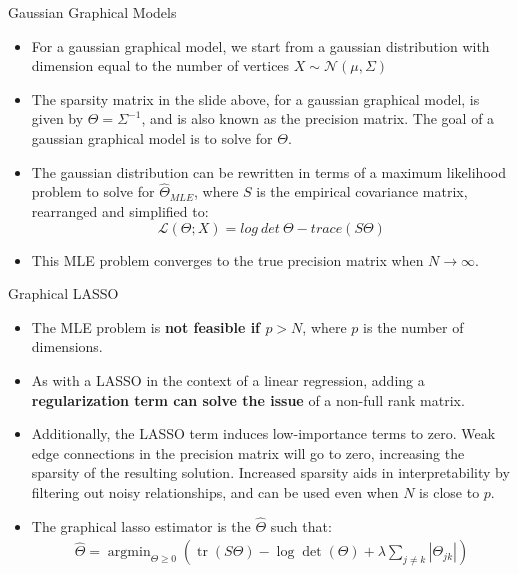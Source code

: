 \documentclass{beamer}
\begin{document}
\begin{frame}{Gaussian Graphical Models}
  \begin{itemize}
    \item For a gaussian graphical model, we start from a gaussian distribution with dimension equal to the number of vertices $X \sim \mathcal{N}(\mu, \Sigma)$
    \item The sparsity matrix in the slide above, for a gaussian graphical model, is given by $\Theta = \Sigma^{-1}$, and is also known as the precision matrix. The goal of a gaussian graphical model is to solve for $\Theta$.
    \item The gaussian distribution can be rewritten in terms of a maximum likelihood problem to solve for $\hat{\Theta}_{MLE}$, where $S$ is the empirical covariance matrix, rearranged and simplified to:
    \[\mathcal{L}(\Theta; X) = log \ det \ \Theta - trace(S \Theta)\]
    \item This MLE problem converges to the true precision matrix when $N \xrightarrow{} \infty$.
  \end{itemize}
\end{frame}

\begin{frame}{Graphical LASSO}
  \begin{itemize}
      \item The MLE problem is \textbf{not feasible if $p > N$}, where $p$ is the number of dimensions.
    \item As with a LASSO in the context of a linear regression, adding a \textbf{regularization term can solve the issue} of a non-full rank matrix.
    \item Additionally, the LASSO term induces low-importance terms to zero.
      Weak edge connections in the precision matrix will go to zero, increasing the sparsity of the resulting solution.
    Increased sparsity aids in interpretability by filtering out noisy relationships, and can be used even when $N$ is close to $p$.
    \item The graphical lasso estimator is the $\hat{\Theta}$ such that:
\begin{align*}
    \hat{\Theta}=\operatorname{argmin}_{\Theta \geq 0}\left(\operatorname{tr}(S \Theta)-\log \operatorname{det}(\Theta)+\lambda \sum_{j \neq k}\left|\Theta_{j k}\right|\right)
\end{align*}
  \end{itemize}
\end{frame}
\end{document}
